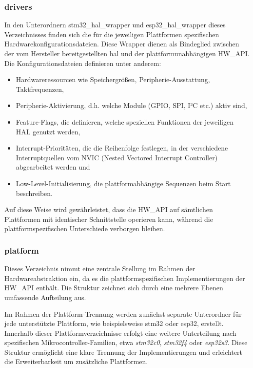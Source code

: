 \subsubsection*{drivers}
In den Unterordnern stm32\_hal\_wrapper und esp32\_hal\_wrapper dieses Verzeichnisses finden sich die für die jeweiligen Plattformen spezifischen Hardwarekonfigurationsdateien.
Diese Wrapper dienen als Bindeglied zwischen der vom Hersteller bereitgestellten \gls{hal} und der plattformunabhängigen HW\_API.
Die Konfigurationsdateien definieren unter anderem:
\begin{itemize}
	\item Hardwareressourcen wie Speichergrößen, Peripherie-Ausstattung, Taktfrequenzen,
	\item Peripherie-Aktivierung, d.h. welche Module (GPIO, SPI, I²C etc.) aktiv sind,
	\item Feature-Flags, die definieren, welche speziellen Funktionen der jeweiligen HAL genutzt werden,
	\item Interrupt-Prioritäten, die die Reihenfolge festlegen, in der verschiedene Interruptquellen vom NVIC (Nested Vectored Interrupt Controller) abgearbeitet werden und
	\item Low-Level-Initialisierung, die plattformabhängige Sequenzen beim Start beschreiben.
\end{itemize}

Auf diese Weise wird gewährleistet, dass die HW\_API auf sämtlichen Plattformen mit identischer Schnittstelle operieren kann, während die plattformspezifischen Unterschiede verborgen bleiben.

\subsubsection*{platform}
Dieses Verzeichnis nimmt eine zentrale Stellung im Rahmen der Hardwareabstraktion ein, da es die plattformspezifischen Implementierungen der HW\_API enthält.
Die Struktur zeichnet sich durch eine mehrere Ebenen umfassende Aufteilung aus.

Im Rahmen der Plattform-Trennung werden zunächst separate Unterordner für jede unterstützte Plattform, wie beispielsweise stm32 oder esp32, erstellt. 
Innerhalb dieser Plattformverzeichnisse erfolgt eine weitere Unterteilung nach spezifischen Mikrocontroller-Familien, etwa \textit{stm32c0}, \textit{stm32f4} oder \textit{esp32s3}. 
Diese Struktur ermöglicht eine klare Trennung der Implementierungen und erleichtert die Erweiterbarkeit um zusätzliche Plattformen.

